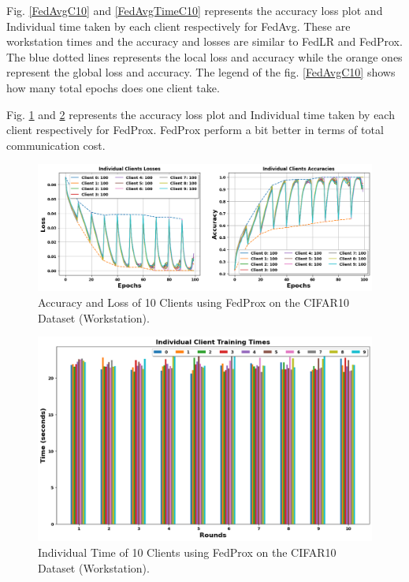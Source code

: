 \documentclass[conference]{IEEEtran}
\begin{document}
Fig. \ref{FedAvgC10} and \ref{FedAvgTimeC10} represents the accuracy loss plot and Individual time taken by each client respectively for FedAvg.  These are workstation times and the accuracy and losses are similar to FedLR and FedProx. The blue dotted lines represents the local loss and accuracy while the orange ones represent the global loss and accuracy. The legend of the fig. \ref{FedAvgC10} shows how many total epochs does one client take.

Fig. \ref{FedProxC10} and \ref{FedProxTimeC10}  represents the accuracy loss plot and Individual time taken by each client respectively for FedProx. FedProx perform a bit better in terms of total communication cost.
%

\begin{figure}[htp!]
	\centering
	\includegraphics[scale=.28]{Images/NEWGRAPHS/3.png }
	\caption{Accuracy and Loss of 10 Clients using FedProx on the CIFAR10 Dataset (Workstation).}
	\label{FedProxC10}
\end{figure}

\begin{figure}[htp!]
	\centering
	\includegraphics[scale=.3]{Images/NEWGRAPHS/4.png }
	\caption{Individual Time of 10 Clients using FedProx on the CIFAR10 Dataset (Workstation).}
	\label{FedProxTimeC10}
\end{figure}
\end{document}
